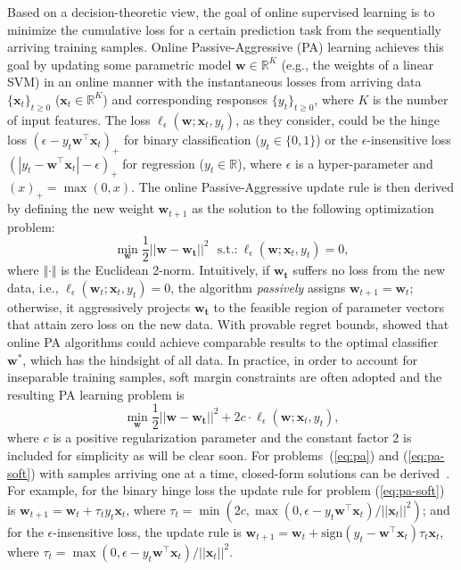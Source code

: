 \documentclass[twoside,11pt]{article}
\newcommand{\xv}{\bm{x}}
\newcommand{\wv}{\bm{w}}
\newcommand{\real}{\mathbb{R}}
\begin{document}
Based on a decision-theoretic view, the goal of online supervised learning is to minimize the cumulative loss for a certain prediction task from the sequentially arriving training samples. Online Passive-Aggressive (PA) learning \citep{crammer2006pa} achieves this goal by updating some parametric model $\bm{w} \in \real^K$ (e.g., the weights of a linear SVM) in an online manner with the instantaneous losses from arriving data $\{\bm{x}_t\}_{t \geq 0}$ ($\xv_t \in \real^K$) and corresponding responses $\{y_t\}_{t \geq 0}$, where $K$ is the number of input features. The loss $\ell_\epsilon(\bm{w}; \bm{x}_t, y_t)$, as they consider, could be the hinge loss $(\epsilon-y_t \wv^\top \xv_t)_+$ for binary classification ($y_t \in \{0,1\}$) or the $\epsilon$-insensitive loss $(|y_t- \wv^\top \xv_t|-\epsilon)_+$ for regression ($y_t \in \mathbb{R}$), where $\epsilon$ is a hyper-parameter and $(x)_+ = \max(0,x)$. The online Passive-Aggressive update rule is then derived by defining the new weight $\bm{w}_{t+1}$ as the solution to the following optimization problem:
\begin{equation}\label{eq:pa}
\min_{\bm{w}}{\frac{1}{2} ||\bm{w}-\bm{w_{t}}||^2} ~~~ \text{s.t.:} ~ \ell_{\epsilon}(\bm{w}; \bm{x}_t, y_t) = 0,
\end{equation}
where $\Vert \cdot \Vert$ is the Euclidean 2-norm. Intuitively, if $\bm{w_t}$ suffers no loss from the new data, i.e., $\ell_{\epsilon}(\bm{w}_t; \bm{x}_t, y_t) = 0$, the algorithm \emph{passively} assigns $\bm{w}_{t+1} = \bm{w}_t$; otherwise, it aggressively projects $\bm{w_t}$ to the feasible region of parameter vectors that attain zero loss on the new data. With provable regret bounds, \cite{crammer2006pa} showed that online PA algorithms could achieve comparable results to the optimal classifier $\bm{w}^*$, which has the hindsight of all data. In practice, in order to account for inseparable training samples, soft margin constraints are often adopted and the resulting PA learning problem is
\begin{equation}\label{eq:pa-soft}
\min_{\bm{w}}{\frac{1}{2} ||\bm{w}-\bm{w_{t}}||^2} + 2 c \cdot \ell_{\epsilon}(\bm{w}; \bm{x}_t, y_t),
\end{equation}
where $c$ is a positive regularization parameter and the constant factor $2$ is included for simplicity as will be clear soon. For problems~(\ref{eq:pa}) and (\ref{eq:pa-soft}) with samples arriving one at a time, closed-form solutions can be derived~\citep{crammer2006pa}. For example, for the binary hinge loss the update rule for problem (\ref{eq:pa-soft}) is $\wv_{t+1} = \wv_t + \tau_t y_t \xv_t$, where $\tau_t = \min(2c, \max(0,\epsilon-y_t \wv^\top \xv_t)/||\xv_t||^2)$; and for the $\epsilon$-insensitive loss, the update rule is $\wv_{t+1} = \wv_t+\text{sign}(y_t-\wv^\top \xv_t) \tau_t \xv_t$, where $\tau_t = \max(0,\epsilon-y_t \wv^\top \xv_t)/||\xv_t||^2$.
\end{document}
